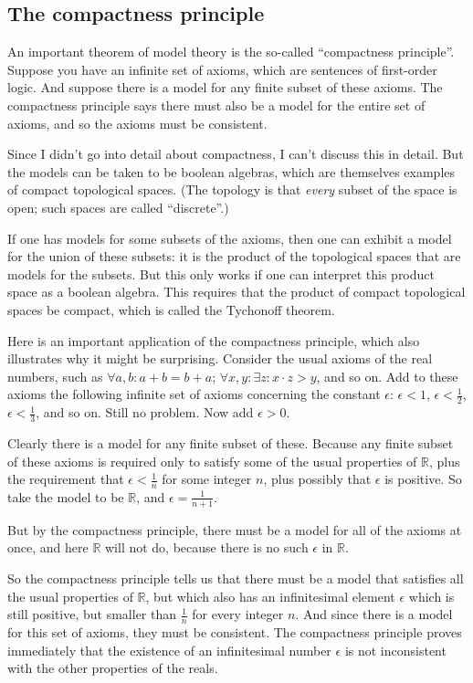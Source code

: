 \documentclass{article}
\def\R{{\mathbb R}}
\begin{document}
\subsection*{The compactness principle}

An important theorem of model theory is the so-called ``compactness
principle''.  Suppose you have an infinite set of axioms,
which are sentences of first-order logic.  And suppose there is a
model for any finite subset of these axioms.  The compactness
principle says there must also be a model for the entire set of
axioms, and so the axioms must be consistent.

Since I didn't go into detail about compactness, I can't discuss this
in detail.  But the models can be taken to be boolean algebras, which
are themselves examples of compact topological spaces.  (The topology
is that {\em every\/} subset of the space is open; such spaces are
called ``discrete''.)

If one has models for some subsets of the axioms, then one can exhibit
a model for the union of these subsets: it is the product of the
topological spaces that are models for the subsets.  But this only
works if one can interpret this product space as a boolean algebra.
This requires that the product of compact topological spaces be
compact, which is called the Tychonoff theorem.

Here is an important application of the compactness principle, which
also illustrates why it might be surprising.  Consider the usual
axioms of the real numbers, such as $\forall a,b : a+b = b+a$;
$\forall x,y : \exists z : x\cdot z > y$, and so on.  Add to these
axioms the following infinite set of axioms concerning the constant
$\epsilon$: $\epsilon < 1$, $\epsilon < \frac12$, $\epsilon <
\frac13$, and so on. Still no problem.  Now add $\epsilon > 0$.

Clearly there is a model for any finite subset of these.
Because any finite subset of these axioms is required only to satisfy
some of the usual properties of $\R$, plus the requirement that
$\epsilon < \frac1n$ for some integer $n$, plus possibly that
$\epsilon$ is positive.  So take the model to be $\R$, and $\epsilon =
\frac1{n+1}$.

But by the compactness principle, there must be a model for all of the
axioms at once, and here $\R$ will not do, because there is no such
$\epsilon$ in $\R$.  

So the compactness principle tells us that there must be a model that
satisfies all the usual properties of $\R$, but which also has an
infinitesimal element $\epsilon$ which is still positive, but smaller
than $\frac1n$ for every integer $n$.  And since there is a model for
this set of axioms, they must be consistent.  The compactness principle
proves immediately that the existence of an infinitesimal number
$\epsilon$ is not inconsistent with the other properties of the reals.
\end{document}
